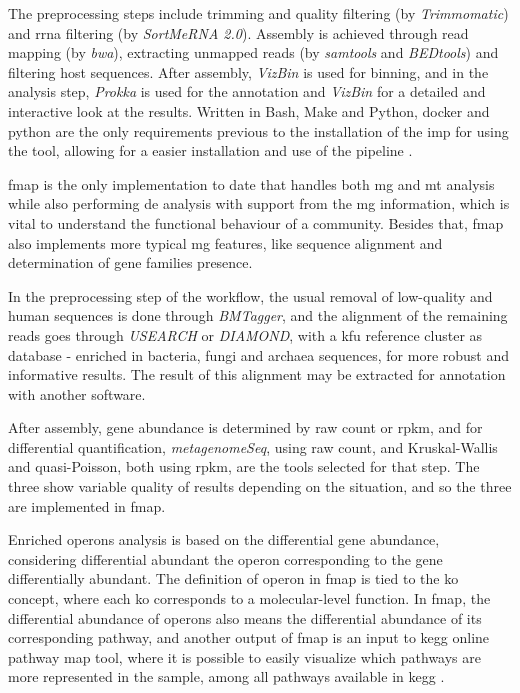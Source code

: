\documentclass[
  oneside,
  11pt, a4paper,
  footinclude=true,
  headinclude=true,
  cleardoublepage=empty
]{scrbook}
\begin{document}
    The preprocessing steps include trimming and quality filtering (by \textit{Trimmomatic}) and \gls{rrna} filtering (by \textit{SortMeRNA 2.0}). Assembly is achieved through read mapping (by \textit{bwa}), extracting unmapped reads (by \textit{samtools} and \textit{BEDtools}) and filtering host sequences.
    After assembly, \textit{VizBin} is used for binning, and in the analysis step, \textit{Prokka} is used for the annotation and \textit{VizBin} for a detailed and interactive look at the results. Written in Bash, Make and Python, docker and python are the only requirements previous to the installation of the \gls{imp} for using the tool, allowing for a easier installation and use of the pipeline \citep{Narayanasamy2016}.
    
    \gls{fmap} is the only implementation to date that handles both \gls{mg} and \gls{mt} analysis while also performing \gls{de} analysis with support from the \gls{mg} information, which is vital to understand the functional behaviour of a community. Besides that, \gls{fmap} also implements more typical \gls{mg} features, like sequence alignment and determination of gene families presence.
    
    In the preprocessing step of the workflow, the usual removal of low-quality and human sequences is done through \textit{BMTagger}, and the alignment of the remaining reads goes through \textit{USEARCH} or \textit{DIAMOND}, with a \gls{kfu} reference cluster as database - enriched in bacteria, fungi and archaea sequences, for more robust and informative results. The result of this alignment may be extracted for annotation with another software.
    
    After assembly, gene abundance is determined by raw count or \gls{rpkm}, and for differential quantification, \textit{metagenomeSeq}, using raw count, and Kruskal-Wallis and quasi-Poisson, both using \gls{rpkm}, are the tools selected for that step. The three show variable quality of results depending on the situation, and so the three are implemented in \gls{fmap}. 
    
    Enriched operons analysis is based on the differential gene abundance, considering differential abundant the operon corresponding to the gene differentially abundant. The definition of operon in \gls{fmap} is tied to the \gls{ko} concept, where each \gls{ko} corresponds to a molecular-level function. In \gls{fmap}, the differential abundance of operons also means the differential abundance of its corresponding pathway, and another output of \gls{fmap} is an input to \gls{kegg} online pathway map tool, where it is possible to easily visualize which pathways are more represented in the sample, among all pathways available in \gls{kegg} \citep{Kim2016}.
    
\end{document}
